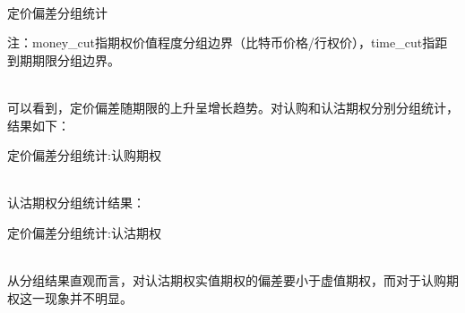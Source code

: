 ~\\
\begin{center}
    \begin{threeparttable}[H]
        \centering
        \begin{small}
            \caption{定价偏差分组统计}
            \label{tab:option_bias_group}
                
                \begin{tablenotes}
                    \footnotesize
                    \item 注：money\_cut指期权价值程度分组边界（比特币价格/行权价），time\_cut指距到期期限分组边界。
                    
                \end{tablenotes}
        \end{small}
    \end{threeparttable}
        
\end{center}
~\\
可以看到，定价偏差随期限的上升呈增长趋势。对认购和认沽期权分别分组统计，结果如下：
~\\
\begin{center}
    \begin{threeparttable}[H]
        \begin{small}
            \caption{定价偏差分组统计:认购期权}
            \label{tab:call_option_bias_group}
                
        \end{small}
    \end{threeparttable}
        
\end{center}
~\\
认沽期权分组统计结果：
~\\
\begin{center}
    \begin{threeparttable}[H]
        \begin{small}
            \caption{定价偏差分组统计:认沽期权}
            \label{tab:put_option_bias_group}
                
    
        \end{small}
    \end{threeparttable}
        
\end{center}
~\\
从分组结果直观而言，对认沽期权实值期权的偏差要小于虚值期权，而对于认购期权这一现象并不明显。
